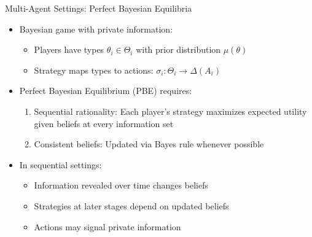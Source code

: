 \documentclass[10pt]{beamer}
\begin{document}
\begin{frame}{Multi-Agent Settings: Perfect Bayesian Equilibria}
    \begin{itemize}
        \item Bayesian game with private information:
        \begin{itemize}
            \item Players have types $\theta_i \in \Theta_i$ with prior distribution $\mu(\theta)$
            \item Strategy maps types to actions: $\sigma_i: \Theta_i \rightarrow \Delta(A_i)$
        \end{itemize}
        \vspace{0.2cm}
        \item Perfect Bayesian Equilibrium (PBE) requires:
        \begin{enumerate}
            \item Sequential rationality: Each player's strategy maximizes expected utility given beliefs at every information set
            \item Consistent beliefs: Updated via Bayes rule whenever possible
        \end{enumerate}
        \vspace{0.2cm}
        \item In sequential settings:
        \begin{itemize}
            \item Information revealed over time changes beliefs
            \item Strategies at later stages depend on updated beliefs
            \item Actions may signal private information
        \end{itemize}
    \end{itemize}
\end{frame}

\end{document}
